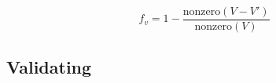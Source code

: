 \documentclass{kthreport}
\theoremstyle{definition}
\begin{document}
\[ f_{v} = 1 - \frac{\text{nonzero}(V - V')}{\text{nonzero}(V)} \]

\subsection{Validating}

\printbibliography
\end{document}
